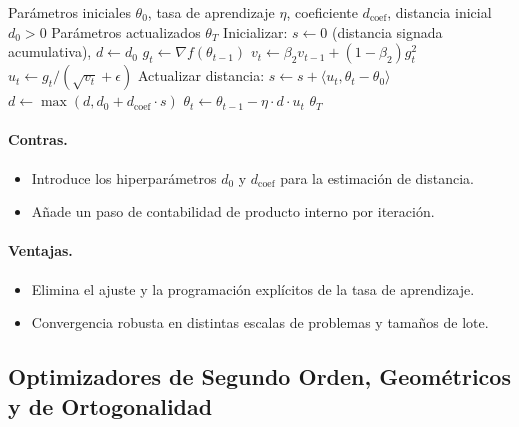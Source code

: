\begin{algorithm}[H]
\caption{Prodigy (Approximating the Distance Estimate)}
\label{alg:prodigy}
\begin{algorithmic}[1]
\Require Parámetros iniciales $\theta_0$, tasa de aprendizaje $\eta$, coeficiente $d_{\text{coef}}$, distancia inicial $d_0 > 0$
\Ensure Parámetros actualizados $\theta_T$
\State Inicializar: $s \gets 0$ (distancia signada acumulativa), $d \gets d_0$
    \State $g_t \gets \nabla f(\theta_{t-1})$
    \State $v_t \gets \beta_2 v_{t-1} + (1-\beta_2) g_t^2$ 
    \State $u_t \gets g_t / (\sqrt{v_t} + \epsilon)$ 
    \State Actualizar distancia: $s \gets s + \langle u_t, \theta_t - \theta_0 \rangle$ 
    \State $d \gets \max(d, d_0 + d_{\text{coef}} \cdot s)$ 
    \State $\theta_t \gets \theta_{t-1} - \eta \cdot d \cdot u_t$ 
\EndFor
\Return $\theta_T$
\end{algorithmic}
\end{algorithm}

\paragraph{Contras.}
\begin{itemize}[leftmargin=*]
\item Introduce los hiperparámetros $d_0$ y $d_{\text{coef}}$ para la estimación de distancia.
\item Añade un paso de contabilidad de producto interno por iteración.
\end{itemize}

\paragraph{Ventajas.}
\begin{itemize}[leftmargin=*]
\item Elimina el ajuste y la programación explícitos de la tasa de aprendizaje.
\item Convergencia robusta en distintas escalas de problemas y tamaños de lote.
\end{itemize}

\subsection{Optimizadores de Segundo Orden, Geométricos y de Ortogonalidad}
